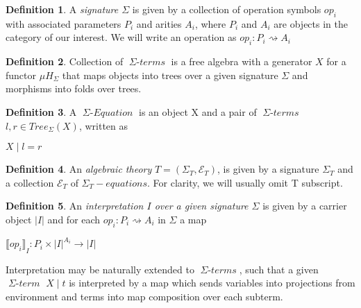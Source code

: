 \documentclass[declaration,shortabstract]{iithesis}
\theoremstyle{definition} \newtheorem{definition}{Definition}[chapter]
\theoremstyle{remark} \newtheorem{remark}[definition]{Observation}
\theoremstyle{plain} \newtheorem{theorem}[definition]{Theorem}
\theoremstyle{plain} \newtheorem{lemma}[definition]{Lemma}
\newcommand{\mathVar}[1]{{\operatorname{\mathit{#1}}}}
\begin{document}
    \begin{definition}

    A \textit{signature $ \Sigma $} is given by a collection of operation
    symbols $ op_{i} $ with associated parameters $ P_{i} $ and arities $ A_{i} $,
    where $ P_{i} $ and $ A_{i} $ are objects in the category of our interest.
    We will write an operation as $ op_{i} : P_{i} \rightsquigarrow A_{i} $

    \end{definition}

    \begin{definition}
    Collection of $\mathVar{\Sigma-terms}$ is a free algebra with a generator $X$
    for a functor $ \mu H_{\Sigma} $ that maps objects into trees over a given
    signature $ \Sigma $ and morphisms into folds over trees.

    \end{definition}

    \begin{definition}

        A $ \mathVar{\Sigma-Equation} $ is an object X and a pair of
        $\mathVar{\Sigma-terms}$ $l, r \in Tree_{\Sigma}(X)$, written as

        \begin{center}
        $ X \mid l = r $
        \end{center}

    \end{definition}

    \begin{definition}

    An \textit{algebraic theory} $T = (\Sigma_{T}, \mathcal{E}_{T})$, is given
    by a signature $\Sigma_{T}$ and a collection $\mathcal{E}_{T}$ of
    $\mathVar{\Sigma_{T}-equations}$. For clarity, we will usually omit T subscript.

    \end{definition}

    \begin{definition}

    An \textit{interpretation $I$ over a given signature $\Sigma$} is given by
    a carrier object $|I|$ and for each $ op_{i} : P_{i} \rightsquigarrow A_{i} $
    in $\Sigma$ a map

    \begin{center}
        $ {\llbracket op_{i} \rrbracket}_I : P_{i} \times{} {|I|}^{A_{i}} \rightarrow |I| $
    \end{center}
    Interpretation may be naturally extended to $\mathVar{\Sigma-terms}$, such
    that a given $\mathVar{\Sigma-term}$ $X \mid t$ is interpreted by a map
    which sends variables into projections from environment and terms into
    map composition over each subterm.

    \end{definition}
\end{document}
